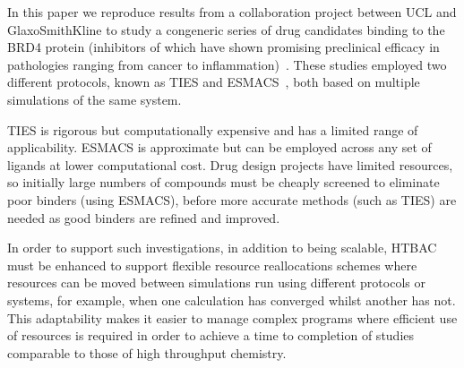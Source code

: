 In this paper we reproduce results from a collaboration project between UCL
and GlaxoSmithKline to study a congeneric series of drug candidates binding to
the BRD4 protein (inhibitors of which have shown promising preclinical
efficacy in pathologies ranging from cancer to
inflammation)~\cite{Wan2017brd4}. These studies employed two different
protocols, known as TIES and ESMACS~\cite{Bhati2017}, both based on multiple
simulations of the same system. 


TIES is rigorous but computationally expensive and has a limited range of 
applicability.
ESMACS is approximate but can be employed across any set of ligands at lower 
computational cost.
Drug design projects have limited resources,
so initially large numbers of compounds must be cheaply screened
to eliminate poor binders (using ESMACS), 
before more accurate methods (such as
TIES) are needed as good binders are refined and improved. %

In order to support such
investigations, in addition to being scalable, HTBAC must be enhanced to
support flexible resource reallocations schemes where resources can be moved
between simulations run using different protocols or systems, for example,
when one calculation has converged whilst another has not. This adaptability
makes it easier to manage complex programs where efficient use of resources
is required in order to achieve a time to completion of studies comparable to
those of high throughput chemistry. 

